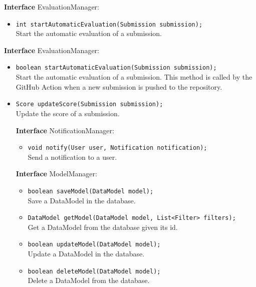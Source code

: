 \textbf{Interface} EvaluationManager:
\begin{itemize}
    \item \texttt{int startAutomaticEvaluation(Submission submission);}
    \\ Start the automatic evaluation of a submission.
\end{itemize}

\textbf{Interface} EvaluationManager:
\begin{itemize}
    \item \texttt{boolean startAutomaticEvaluation(Submission submission);}
    \\ Start the automatic evaluation of a submission. This method is called by the GitHub Action when a new submission is pushed to the repository.
    \item \texttt{Score updateScore(Submission submission);}
    \\ Update the score of a submission.

\textbf{Interface} NotificationManager:
\begin{itemize}
    \item \texttt{void notify(User user, Notification notification);}
    \\ Send a notification to a user.
\end{itemize}

\textbf{Interface} ModelManager:
\begin{itemize}
    \item \texttt{boolean saveModel(DataModel model);}
    \\ Save a DataModel in the database.
    \item \texttt{DataModel getModel(DataModel model, List<Filter> filters);}
    \\ Get a DataModel from the database given its id.
    \item \texttt{boolean updateModel(DataModel model);}
    \\ Update a DataModel in the database.
    \item \texttt{boolean deleteModel(DataModel model);}
    \\ Delete a DataModel from the database.
\end{itemize}


\end{itemize}

